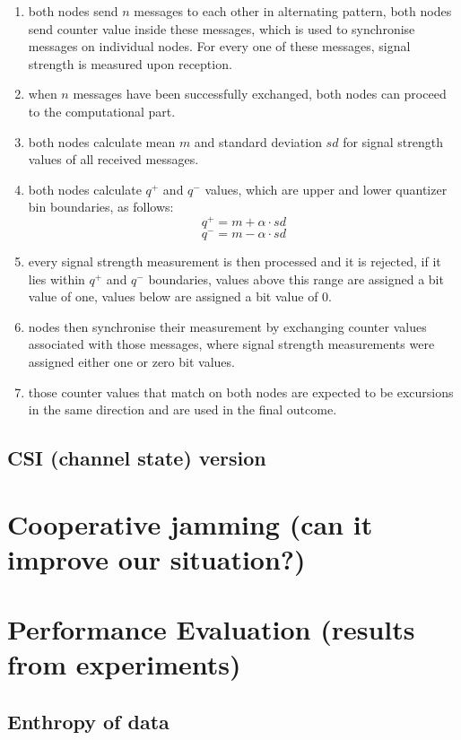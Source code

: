 \documentclass[
  digital, %
  table,   %
  nolof,     %
  nolot,     %
           oneside
]{fithesis3}
\begin{document}
    \begin{enumerate}
      \item both nodes send $n$ messages to each other in alternating pattern, both nodes send counter value inside these messages, which is used to synchronise messages on individual nodes. For every one of these messages, signal strength is measured upon reception.
      \item when $n$ messages have been successfully exchanged, both nodes can proceed to the computational part.
      \item both nodes calculate mean $m$ and standard deviation $sd$ for signal strength values of all received messages.
      \item both nodes calculate $q^+$ and $q^-$ values, which are upper and lower quantizer bin boundaries, as follows:
      $$q^+ = m + \alpha \cdot sd$$
      $$q^- = m - \alpha \cdot sd$$
      \item every signal strength measurement is then processed and it is rejected, if it lies within $q^+$ and $q^-$ boundaries, values above this range are assigned a bit value of one, values below are assigned a bit value of 0.
      \item nodes then synchronise their measurement by exchanging counter values associated with those messages, where signal strength measurements were assigned either one or zero bit values.
      \item those counter values that match on both nodes are expected to be excursions in the same direction and are used in the final outcome.

    \end{enumerate}
    \subsection{CSI (channel state) version}
  \section{Cooperative jamming (can it improve our situation?)}
  \section{Performance Evaluation (results from experiments)}
    \subsection{Enthropy of data}
\end{document}
